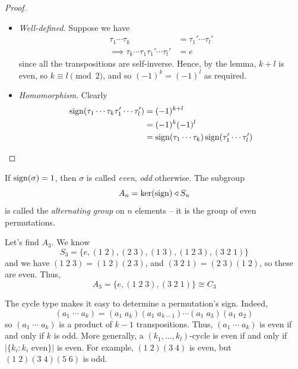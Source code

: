 \documentclass{../template/note}
\begin{document}
    \begin{proof}
        \begin{itemize}
            \item \emph{Well-defined}. Suppose we have
            \begin{align*}
                \tau_1 \cdots \tau_k &= \tau_1' \cdots \tau_l' \\
                \implies \tau_k \cdots \tau_1 \tau_1' \cdots \tau_l' &= e
            \end{align*}
            since all the transpositions are self-inverse. Hence, by the lemma, \(k+l\) is even, so \(k \equiv l \pmod 2\), and so \((-1)^k = (-1)^l\) as required.
            \item \emph{Homomorphism}. Clearly
            \begin{align*}
                \operatorname{sign}(\tau_1 \cdots \tau_k \tau_1' \cdots \tau_l') &= (-1)^{k+l} \\
                &= (-1)^k(-1)^l \\
                &= \operatorname{sign}(\tau_1 \cdots \tau_k)\operatorname{sign}(\tau_1' \cdots \tau_l')
            \end{align*}
        \end{itemize}
    \end{proof}
    
    \begin{definition}
        If \(\operatorname{sign}(\sigma) = 1\), then \(\sigma\) is called \emph{even}, \emph{odd} otherwise. The subgroup
        \[
            A_n = \ker(\operatorname{sign}) \triangleleft S_n
        \]
        is called the \emph{alternating group} on \(n\) elements -- it is the group of even permutations.
    \end{definition}
    
    \begin{example}
        Let's find \(A_3\). We know
        \[
            S_3 = \{e, (1\; 2), (2 \; 3), (1 \; 3), (1 \; 2 \; 3), (3 \; 2 \; 1)\}
        \]
        and we have \((1 \; 2 \; 3) = (1 \; 2)(2 \; 3)\), and \((3 \; 2 \; 1) = (2 \; 3)(1 \; 2)\), so these are even. Thus,
        \[
            A_3 = \{e, (1 \; 2 \; 3), (3 \; 2 \; 1)\} \cong C_3
        \]
    \end{example}
    
    \begin{remark*}
        The cycle type makes it easy to determine a permutation's sign. Indeed,
        \[
            (a_1\; \cdots \; a_k) = (a_1 \; a_k) (a_1 \; a_{k-1}) \cdots (a_1 \; a_3)(a_1 \; a_2)
        \]
        so \((a_1 \; \cdots \; a_k)\) is a product of \(k-1\) transpositions. Thus, \((a_1 \; \cdots \; a_k)\) is even if and only if \(k\) is odd. More generally, a \((k_1, \dots, k_l)\)-cycle is even if and only if \(|\{k_i : k_i \text{ even}\}|\) is even. For example, \((1 \; 2)(3 \; 4)\) is even, but \((1 \; 2)(3 \; 4)(5 \; 6)\) is odd.
    \end{remark*}
    
\end{document}
